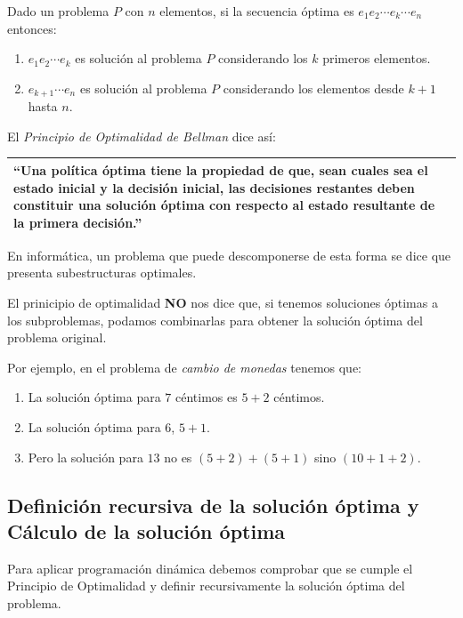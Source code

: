 \documentclass[10pt,a4paper,spanish]{report}
\theoremstyle{definition}
\theoremstyle{remark}
\begin{document}
Dado un problema $P$ con $n$ elementos, si la secuencia óptima es $e_1 e_2 \cdots e_k \cdots e_n$ entonces:
\begin{enumerate}[\color{amethyst}{$\heartsuit$}]
    \item $e_1 e_2 \cdots e_k$ es solución al problema $P$ considerando los $k$ primeros elementos.
    \item $e_{k+1} \cdots e_n$ es solución al problema $P$ considerando los elementos desde $k+1$ hasta $n$.
\end{enumerate}

El \textit{\textcolor{amethyst}{Principio de Optimalidad de Bellman}} dice así:

\begin{tabular}{p{12.5cm}}
\hline
``Una política óptima tiene la propiedad de que, sean cuales sea el estado inicial y la decisión inicial, las decisiones restantes deben constituir una solución óptima con respecto al estado resultante de la primera decisión.''\\
\hline
\end{tabular}

En informática, un problema que puede descomponerse de esta forma se dice que presenta subestructuras optimales.

El prinicipio de optimalidad \textbf{\textcolor{amethyst}{NO}} nos dice que, si tenemos soluciones óptimas a los subproblemas, podamos combinarlas para obtener la solución óptima del problema original.

Por ejemplo, en el problema de \textit{\textcolor{amethyst}{cambio de monedas}} tenemos que:
\begin{enumerate}[\color{amethyst}{$\heartsuit$}]
    \item La solución óptima para $7$ céntimos es $5+2$ céntimos.
    \item La solución óptima para $6$, $5+1$.
    \item Pero la solución para $13$ no es $(5+2) + (5+1)$ sino $(10+1+2)$.
\end{enumerate}

\subsection{\textcolor{amethyst}Definición recursiva de la solución óptima y Cálculo de la solución óptima}

Para aplicar programación dinámica debemos comprobar que se cumple el Principio de Optimalidad y definir recursivamente la solución óptima del problema.
\end{document}
